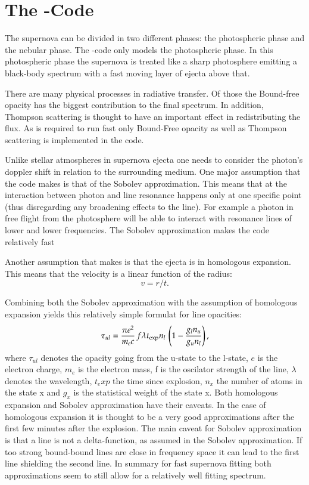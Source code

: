 \section{The \mlc-Code}

The supernova can be divided in two different phases: the photospheric phase and the nebular phase. The \mlc-code only models the photospheric phase.
In this photospheric phase the supernova is treated like a sharp photosphere emitting a black-body spectrum with a fast moving layer of ejecta above that. 

There are many physical processes in radiative transfer. Of those the Bound-free opacity has the biggest contribution to the final spectrum. In addition, Thompson scattering is thought to have an important effect in redistributing the flux. As \mlc is required to run fast only Bound-Free opacity as well as Thompson scattering is implemented in the code.

Unlike stellar atmospheres in supernova ejecta one needs to consider the photon's doppler shift in relation to the surrounding medium. One major assumption that the code makes is that of the Sobolev approximation.  This means that at the interaction between photon and line resonance happens only at one specific point (thus disregarding any broadening effects to the line). For example a photon in free flight from the photosphere will be able to interact with resonance lines of lower and lower frequencies. The Sobolev approximation makes the code relatively fast 

Another assumption that \mlc makes is that the ejecta is in homologous expansion. This means that the velocity is a linear function of the radius:
\[
	v=  r / t.
\]

Combining both the Sobolev approximation with the assumption of homologous expansion yields this relatively simple formulat for line opacities:
\[
\tau_{ul} = \frac{\pi e^2}{m_e c}\, f \lambda t_{\rm exp} n_l\, \left(1 - \frac{g_l n_u}{g_u n_l}\right), 
\]
where $\tau_{ul}$ denotes the opacity going from the u-state to the l-state, $e$ is the electron charge, $m_e$ is the electron mass, f is the oscilator strength of the line, $\lambda$ denotes the wavelength, $t_exp$ the time since explosion, $n_x$ the number of atoms in the state x and $g_x$ is the statistical weight of the state x.
Both homologous expansion and Sobolev approximation have their caveats. In the case of homologous expansion it is thought to be a very good approximations after the first few minutes after the explosion. The main caveat for Sobolev approximation is that a line is not a delta-function, as assumed in the Sobolev approximation. If too strong bound-bound lines are close in frequency space it can lead to the first line shielding the second line. In summary for fast supernova fitting both approximations seem to still allow for a relatively well fitting spectrum.

